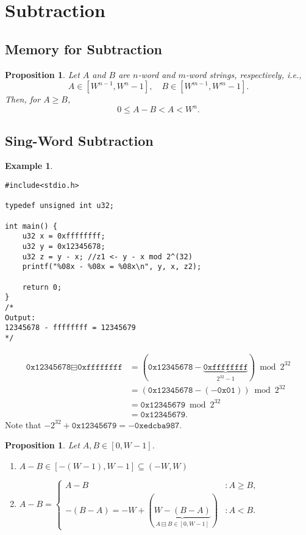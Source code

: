 \documentclass[12pt,openany]{book}
\newtheorem{proposition}[theorem]{Proposition}
\theoremstyle{definition}
\newtheorem{example}{Example}[chapter]
\newcommand{\ie}{\textnormal{i.e.}}
\begin{document}
	\newpage
	\section{Subtraction}
	\subsection{Memory for Subtraction}
	\begin{tcolorbox}[colframe=procolor,title={\color{white}\bf Upper and Lower Bound of Subtraction}]
		\begin{proposition}
			Let $A$ and $B$ are \(n\)-word and \(m\)-word strings, respectively, \ie, \[
			A\in[W^{n-1},W^{n}-1],\quad B\in[W^{m-1},W^m-1].
			\] Then, for \(A\geq B\), \[
			0\leq A-B<A<W^n.
			\]
		\end{proposition}
	\end{tcolorbox}

	\subsection{Sing-Word Subtraction}
	
	\begin{example}
		\ \begin{lstlisting}[style=C, caption={},captionpos=t]
#include<stdio.h>

typedef unsigned int u32;

int main() {
	u32 x = 0xffffffff;
	u32 y = 0x12345678;
	u32 z = y - x; //z1 <- y - x mod 2^(32)
	printf("%08x - %08x = %08x\n", y, x, z2);
	
	return 0;
}
/*
Output:
12345678 - ffffffff = 12345679
*/
		\end{lstlisting}
		\begin{align*}
			\texttt{0x12345678}\boxminus\texttt{0xffffffff} &= (\texttt{0x12345678} - \underbrace{\texttt{0xffffffff}}_{2^{32}-1}) \bmod 2^{32}\\
			&=(\texttt{0x12345678} - (-\texttt{0x01})) \bmod 2^{32}\\
			&=\texttt{0x12345679} \bmod 2^{32}\\
			&=\texttt{0x12345679}.
		\end{align*} Note that \(-2^{32}+\texttt{0x12345679} = -\texttt{0xedcba987}\).
	\end{example}
	
	\begin{tcolorbox}[colframe=procolor,title={\color{white}\bf Single-Word Subtraction \(A-B\)}]
		\begin{proposition}
			Let \(A,B\in[0,W-1]\). \begin{enumerate}[(1)]
				\item \(A-B\in[-(W-1), W-1]\subseteq(-W,W)\)
				\item \(\displaystyle A-B=\begin{cases}
					A-B &:A\geq B,\\
					-(B-A)=-W+(\underbrace{W-(B-A)}_{A\boxminus B\in[0,W-1]}) &:A<B.
				\end{cases}\)
			\end{enumerate}
		\end{proposition}
	\end{tcolorbox}
\end{document}
